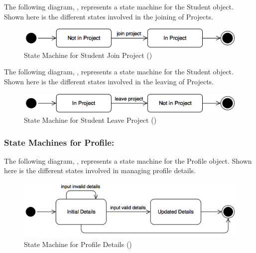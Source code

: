 \documentclass[12pt,letterpaper]{article}
\begin{document}
The following diagram, , represents a state machine for the Student object. Shown here is the different states involved in the joining of Projects.

\begin{figure}[H]
	\centering{}
	\includegraphics[scale=0.3]{imgs/state/student-join-project.png}
	\caption[ - State Machine for Student Join Project]{State Machine for Student Join Project ()}
\end{figure}

\noindent The following diagram, , represents a state machine for the Student object. Shown here is the different states involved in the leaving of Projects.

\begin{figure}[H]
	\centering{}
	\includegraphics[scale=0.3]{imgs/state/student-leave-project.png}
	\caption[ - State Machine for Student Leave Project]{State Machine for Student Leave Project ()}
\end{figure}

\newpage{}

\subsubsection*{State Machines for Profile:}

The following diagram, , represents a state machine for the Profile object. Shown here is the different states involved in managing profile details.

\begin{figure}[H]
	\centering{}
	\includegraphics[scale=0.3]{imgs/state/profile-details.png}
	\caption[ - State Machine for Profile Details]{State Machine for Profile Details ()}
\end{figure}
\end{document}
